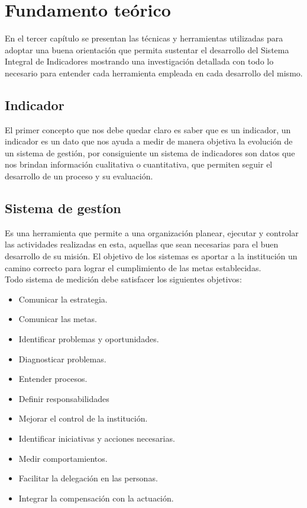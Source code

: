 \chapter{Fundamento te\'orico}

	En el tercer cap\'itulo se presentan las t\'ecnicas y herramientas utilizadas para adoptar una buena orientaci\'on que permita sustentar el desarrollo del Sistema Integral de Indicadores mostrando una investigaci\'on detallada con todo lo necesario para entender cada herramienta empleada en cada desarrollo del mismo.

	\section{Indicador}
		El primer concepto que nos debe quedar claro es saber que es un indicador, un indicador es un dato que nos ayuda a medir de manera objetiva la evoluci\'on de un sistema de gesti\'on, por consiguiente un sistema de indicadores son datos que nos brindan informaci\'on cualitativa o cuantitativa, que permiten seguir el desarrollo de un proceso y su evaluaci\'on.

	\section{Sistema de gest\'ion}
		Es una herramienta que permite a una organizaci\'on planear, ejecutar y controlar las actividades realizadas en esta, aquellas que sean necesarias para el buen desarrollo de su misi\'on. El objetivo de los sistemas es aportar a la instituci\'on  un camino correcto para lograr el cumplimiento de las metas establecidas. \\
	
	Todo sistema de medici\'on debe satisfacer los siguientes objetivos:

	\begin{itemize}
		\item Comunicar la estrategia.
		\item Comunicar las metas.
		\item Identificar problemas y oportunidades.
		\item Diagnosticar problemas.
		\item Entender procesos.
		\item Definir responsabilidades
		\item Mejorar el control de la instituci\'on.
		\item Identificar iniciativas y acciones necesarias.
		\item Medir comportamientos.
		\item Facilitar la delegaci\'on en las personas.
		\item Integrar la compensaci\'on con la actuaci\'on. 
	\end{itemize}

